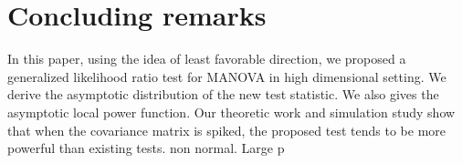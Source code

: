 \documentclass[12pt]{article} %
\theoremstyle{definition}
\begin{document}

\section{Concluding remarks}
In this paper, using the idea of least favorable direction, we proposed a generalized likelihood ratio test for MANOVA in high dimensional setting.
We derive the asymptotic distribution of the new test statistic. We also gives the asymptotic local power function.
Our theoretic work and simulation study show that when the covariance matrix is spiked, the  proposed test 
tends to be more powerful than existing tests.
{\color{red}non normal. Large p}
\end{document}
